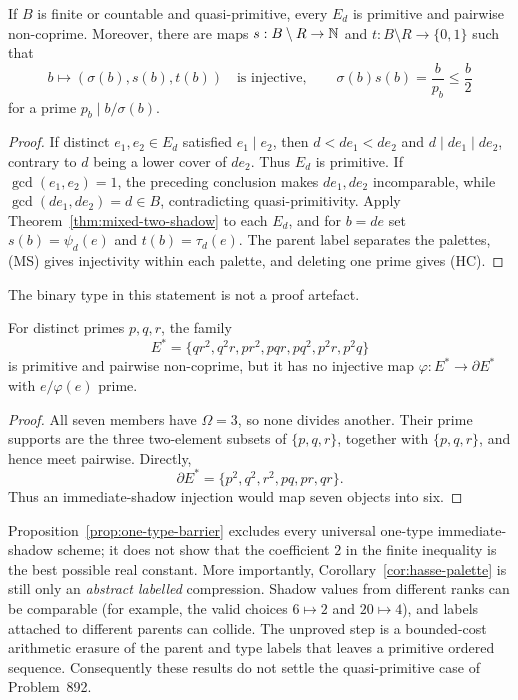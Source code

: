 \begin{corollary}\label{cor:hasse-palette}
If $B$ is finite or countable and quasi-primitive, every $E_d$ is primitive
and pairwise non-coprime.  Moreover, there are maps
$s:B\setminus R\to\mathbb N$ and $t:B\setminus R\to\{0,1\}$ such that
\[
  b\longmapsto(\sigma(b),s(b),t(b))
  \quad\text{is injective},
  \qquad
  \sigma(b)s(b)=\frac{b}{p_b}\leq\frac b2
  \tag{HC}
\]
for a prime $p_b\mid b/\sigma(b)$.
\end{corollary}

\begin{proof}
If distinct $e_1,e_2\in E_d$ satisfied $e_1\mid e_2$, then
$d<de_1<de_2$ and $d\mid de_1\mid de_2$, contrary to $d$ being a lower
cover of $de_2$.  Thus $E_d$ is primitive.  If
$\gcd(e_1,e_2)=1$, the preceding conclusion makes $de_1,de_2$
incomparable, while
$\gcd(de_1,de_2)=d\in B$, contradicting quasi-primitivity.  Apply
Theorem~\ref{thm:mixed-two-shadow} to each $E_d$, and for $b=de$ set
$s(b)=\psi_d(e)$ and $t(b)=\tau_d(e)$.  The parent label separates the
palettes, (MS) gives injectivity within each palette, and deleting one prime
gives (HC).
\end{proof}

The binary type in this statement is not a proof artefact.

\begin{proposition}\label{prop:one-type-barrier}
For distinct primes $p,q,r$, the family
\[
 E^\ast=\{qr^2,q^2r,pr^2,pqr,pq^2,p^2r,p^2q\}
\]
is primitive and pairwise non-coprime, but it has no injective map
$\varphi:E^\ast\to\partial E^\ast$ with $e/\varphi(e)$ prime.
\end{proposition}

\begin{proof}
All seven members have $\Omega=3$, so none divides another.  Their prime
supports are the three two-element subsets of $\{p,q,r\}$, together with
$\{p,q,r\}$, and hence meet pairwise.  Directly,
\[
  \partial E^\ast=\{p^2,q^2,r^2,pq,pr,qr\}.
\]
Thus an immediate-shadow injection would map seven objects into six.
\end{proof}

Proposition~\ref{prop:one-type-barrier} excludes every universal one-type
immediate-shadow scheme; it does not show that the coefficient $2$ in the
finite inequality is the best possible real constant.  More importantly,
Corollary~\ref{cor:hasse-palette} is still only an \emph{abstract labelled}
compression.  Shadow values from different ranks can be comparable (for
example, the valid choices $6\mapsto2$ and $20\mapsto4$), and labels attached
to different parents can collide.  The unproved step is a bounded-cost
arithmetic erasure of the parent and type labels that leaves a primitive
ordered sequence.  Consequently these results do not settle the
quasi-primitive case of Problem~892.


